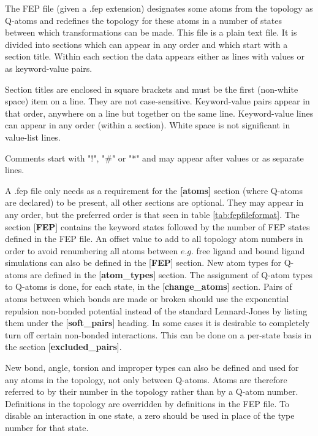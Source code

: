 \documentclass[a4paper,10pt]{article}
\begin{document}
The FEP file  (given a .fep extension) designates some  atoms from the
topology as  Q-atoms and redefines the  topology for these atoms  in a
number of states between which  transformations can be made. This file
is a plain text file. It is  divided into sections which can appear in
any order  and which start with  a section title. Within  each section
the data appears either as lines with values or as keyword-value pairs.

Section titles are  enclosed in square brackets and must  be the first
(non-white    space)    item    on    a    line.    They    are    not
case-sensitive. Keyword-value pairs appear  in that order, anywhere on
a line but  together on the same line. Keyword-value  lines can appear
in any  order (within a  section). White  space is not  significant in
value-list lines.

Comments start with "!", "\#" or "*" and may appear after values or as
separate lines.

A  .fep file  only needs  as  a requirement  for the  \textbf{[atoms]}
section (where  Q-atoms are  declared) to be  present, all  other 
sections are optional. They may appear in any order, but the preferred
order is that seen in table \ref{tab:fepfileformat}.  The section
[\textbf{FEP}] contains the  keyword states followed by  the number of
FEP states  defined in  the FEP file.  An offset value  to add  to all
topology atom numbers in order  to avoid renumbering all atoms between
$e.g.$ free ligand and bound ligand simulations can also be defined in
the [\textbf{FEP}] section. New atom  types for Q-atoms are defined in
the [\textbf{atom\_types}] section. The  assignment of Q-atom types to
Q-atoms  is  done, for  each  state,  in the  [\textbf{change\_atoms}]
section. Pairs of atoms between which  bonds are made or broken should
use  the exponential  repulsion  non-bonded potential  instead of  the
standard     Lennard-Jones    by     listing     them    under     the
[\textbf{soft\_pairs}]  heading.  In some  cases  it  is desirable  to
completely turn off certain non-bonded  interactions. This can be done
on a per-state basis in the section [\textbf{excluded\_pairs}].

New bond,  angle, torsion and improper  types can also be  defined and
used for any  atoms in the topology, not only  between Q-atoms.  Atoms
are therefore referred to by their  number in the topology rather than
by  a Q-atom  number. Definitions  in the  topology are  overridden by
definitions in the FEP file. To disable an interaction in one state, a
zero should be used in place of the type number for that state.
\end{document}
